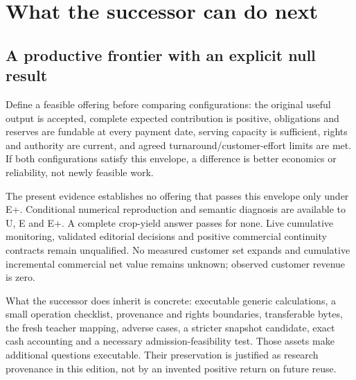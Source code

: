 \documentclass[11pt]{article}
\begin{document}
\section{What the successor can do next}

\subsection{A productive frontier with an explicit null result}

Define a feasible offering before comparing configurations: the original useful output is accepted, complete expected contribution is positive, obligations and reserves are fundable at every payment date, serving capacity is sufficient, rights and authority are current, and agreed turnaround/customer-effort limits are met. If both configurations satisfy this envelope, a difference is better economics or reliability, not newly feasible work.

The present evidence establishes no offering that passes this envelope only under E+. Conditional numerical reproduction and semantic diagnosis are available to U, E and E+. A complete crop-yield answer passes for none. Live cumulative monitoring, validated editorial decisions and positive commercial continuity contracts remain unqualified. No measured customer set expands and cumulative incremental commercial net value remains unknown; observed customer revenue is zero.

What the successor does inherit is concrete: executable generic calculations, a small operation checklist, provenance and rights boundaries, transferable bytes, the fresh teacher mapping, adverse cases, a stricter snapshot candidate, exact cash accounting and a necessary admission-feasibility test. Those assets make additional questions executable. Their preservation is justified as research provenance in this edition, not by an invented positive return on future reuse.
\end{document}
